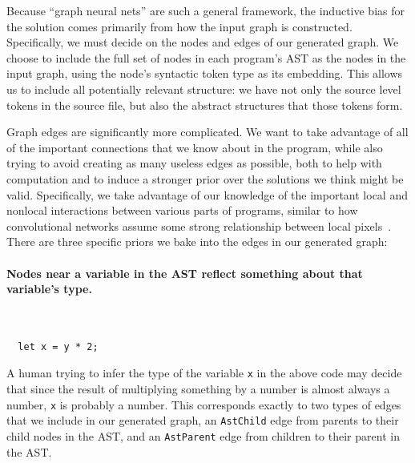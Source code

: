 Because ``graph neural nets'' are such a general framework, the inductive bias for the solution comes primarily from how the input graph is constructed.
Specifically, we must decide on the nodes and edges of our generated graph.
We choose to include the full set of nodes in each program's AST as the nodes in the input graph, using the node's syntactic token type as its embedding.
This allows us to include all potentially relevant structure: we have not only the source level tokens in the source file, but also the abstract structures that those tokens form.

Graph edges are significantly more complicated.
We want to take advantage of all of the important connections that we know about in the program, while also trying to avoid creating as many useless edges as possible, both to help with computation and to induce a stronger prior over the solutions we think might be valid.
Specifically, we take advantage of our knowledge of the important local and nonlocal interactions between various parts of programs, similar to how convolutional networks assume some strong relationship between local pixels~\cite{henaff2015deep}.
There are three specific priors we bake into the edges in our generated graph:

\paragraph{Nodes near a variable in the AST reflect something about that variable's type.}\
\ %
\begin{lstlisting}
  let x = y * 2;
\end{lstlisting}
A human trying to infer the type of the variable \texttt{x} in the above code may decide that since the result of multiplying something by a number is almost always a number, \texttt{x} is probably a number.
This corresponds exactly to two types of edges that we include in our generated graph, an \texttt{AstChild} edge from parents to their child nodes in the AST, and an \texttt{AstParent} edge from children to their parent in the AST.

